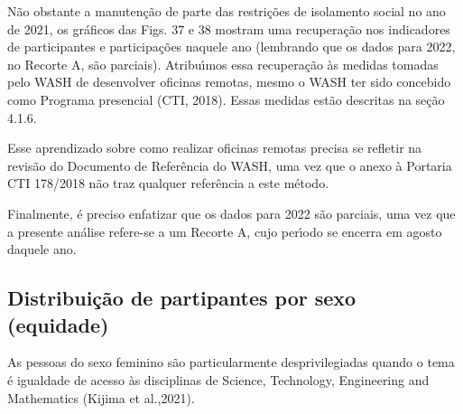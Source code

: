 \documentclass[
12pt,		%
openright,	%
twoside,  %
a4paper,			%
chapter=TITLE,		%
english,			%
french,				%
spanish,			%
brazil				%
]{USPSC-classe/USPSC}
\begin{document}
N\~ao obstante a manuten\c{c}\~ao de parte das restri\c{c}\~oes de isolamento social no ano de 2021, os gr\'aficos das Figs. 37 e 38 mostram uma recupera\c{c}\~ao nos indicadores de participantes e participa\c{c}\~oes naquele ano (lembrando que os dados para 2022, no Recorte A, s\~ao parciais). Atribu\'{\i}mos essa recupera\c{c}\~ao \`as medidas tomadas pelo WASH de desenvolver oficinas remotas, mesmo o WASH ter sido concebido como Programa presencial  (CTI, 2018). Essas medidas est\~ao descritas na se\c{c}\~ao 4.1.6.

















Esse aprendizado sobre como realizar oficinas remotas precisa se refletir na revis\~ao do Documento de Refer\^encia do WASH, uma vez que o anexo \`a Portaria CTI 178/2018 n\~ao traz qualquer refer\^encia a este m\'etodo.

















Finalmente, \'e preciso enfatizar que os dados para 2022 s\~ao parciais, uma vez que a presente an\'alise refere-se a um Recorte A, cujo per\'{\i}odo se encerra em agosto daquele ano.

















\subsection[Distribui\c{c}\~ao de partipantes por sexo (equidade)]{Distribui\c{c}\~ao de partipantes por sexo (equidade)}\label{Distribui\c{c}\~ao de partipantes por sexo (equidade)}
As pessoas do sexo feminino s\~ao particularmente desprivilegiadas quando o tema \'e igualdade de acesso \`as disciplinas de Science, Technology, Engineering and Mathematics (Kijima et al.,2021).
\end{document}
